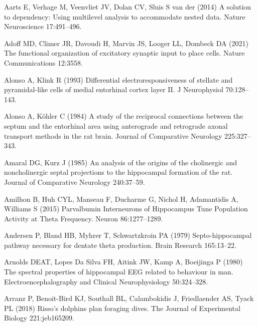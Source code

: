 \documentclass[
  12pt,
  a4paper,
  openany]{book}
\newlength{\cslhangindent}
\newlength{\cslentryspacingunit} %
\newenvironment{CSLReferences}[2] %
 {%
  \setlength{\parindent}{0pt}
  \ifodd #1
  \let\oldpar\par
  \def\par{\hangindent=\cslhangindent\oldpar}
  \fi
  \setlength{\parskip}{#2\cslentryspacingunit}
 }%
 {}
\begin{document}
\hypertarget{refs}{}
\begin{CSLReferences}{1}{0}
\leavevmode{}%
Aarts E, Verhage M, Veenvliet JV, Dolan CV, Sluis S van der (2014) A solution to dependency: Using multilevel analysis to accommodate nested data. Nature Neuroscience 17:491--496.

\leavevmode{}%
Adoff MD, Climer JR, Davoudi H, Marvin JS, Looger LL, Dombeck DA (2021) The functional organization of excitatory synaptic input to place cells. Nature Communications 12:3558.

\leavevmode{}%
Alonso A, Klink R (1993) Differential electroresponsiveness of stellate and pyramidal-like cells of medial entorhinal cortex layer {II}. J Neurophysiol 70:128--143.

\leavevmode{}%
Alonso A, Köhler C (1984) A study of the reciprocal connections between the septum and the entorhinal area using anterograde and retrograde axonal transport methods in the rat brain. Journal of Comparative Neurology 225:327--343.

\leavevmode{}%
Amaral DG, Kurz J (1985) An analysis of the origins of the cholinergic and noncholinergic septal projections to the hippocampal formation of the rat. Journal of Comparative Neurology 240:37--59.

\leavevmode{}%
Amilhon B, Huh CYL, Manseau F, Ducharme G, Nichol H, Adamantidis A, Williams S (2015) Parvalbumin {Interneurons} of {Hippocampus} {Tune} {Population} {Activity} at {Theta} {Frequency}. Neuron 86:1277--1289.

\leavevmode{}%
Andersen P, Bland HB, Myhrer T, Schwartzkroin PA (1979) Septo-hippocampal pathway necessary for dentate theta production. Brain Research 165:13--22.

\leavevmode{}%
Arnolds DEAT, Lopes Da Silva FH, Aitink JW, Kamp A, Boeijinga P (1980) The spectral properties of hippocampal {EEG} related to behaviour in man. Electroencephalography and Clinical Neurophysiology 50:324--328.

\leavevmode{}%
Arranz P, Benoit-Bird KJ, Southall BL, Calambokidis J, Friedlaender AS, Tyack PL (2018) Risso's dolphins plan foraging dives. The Journal of Experimental Biology 221:jeb165209.


\end{CSLReferences}
\end{document}
